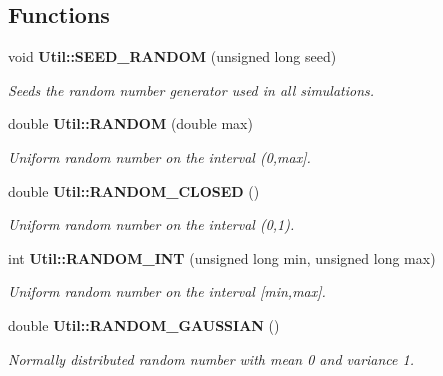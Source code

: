 \subsection*{Functions}
\begin{CompactItemize}
\item 
void {\bf Util::SEED\_\-RANDOM} (unsigned long seed)
\begin{CompactList}\small\item\em Seeds the random number generator used in all simulations. \item\end{CompactList}\item 
double {\bf Util::RANDOM} (double max)
\begin{CompactList}\small\item\em Uniform random number on the interval (0,max]. \item\end{CompactList}\item 
double {\bf Util::RANDOM\_\-CLOSED} ()
\begin{CompactList}\small\item\em Uniform random number on the interval (0,1). \item\end{CompactList}\item 
int {\bf Util::RANDOM\_\-INT} (unsigned long min, unsigned long max)
\begin{CompactList}\small\item\em Uniform random number on the interval [min,max]. \item\end{CompactList}\item 
double {\bf Util::RANDOM\_\-GAUSSIAN} ()
\begin{CompactList}\small\item\em Normally distributed random number with mean 0 and variance 1. \item\end{CompactList}\end{CompactItemize}
